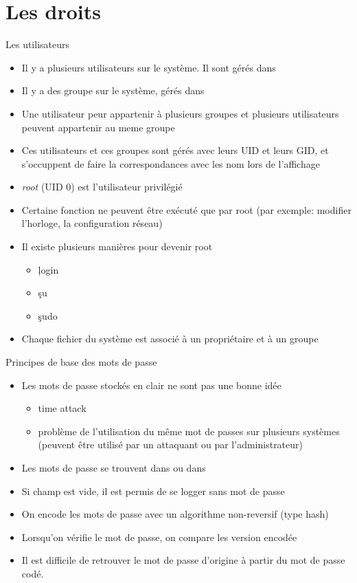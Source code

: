 \section{Les droits}

\begin{frame}[fragile=singleslide]{Les utilisateurs}
  \begin{itemize}
  \item Il  y a plusieurs utilisateurs  sur le système.  Il sont gérés
    dans 
  \item Il y a des groupe sur le système, gérés dans 
  \item  Une  utilisateur  peur  appartenir  à  plusieurs  groupes  et
    plusieurs utilisateurs peuvent appartenir au meme groupe
  \item Ces utilisateurs  et ces groupes sont gérés avec  leurs UID et leurs
    GID,  et   s'occuppent de faire
    la correspondances avec les nom lors de l'affichage
  \item \emph{root} (UID 0) est l'utilisateur privilégié
  \item Certaine  fonction ne peuvent  être exécuté que par  root (par
    exemple: modifier l'horloge, la configuration réseau)
  \item Il existe plusieurs manières pour devenir \c{root}
    \begin{itemize}
    \item \c{login}
    \item \c{su}
    \item \c{sudo}
    \end{itemize}
  \item Chaque fichier  du système est associé à  un propriétaire et à
    un groupe
  \end{itemize}
\end{frame}

\begin{frame}[fragile=singleslide]{Principes de base des mots de passe}
\begin{itemize} 
\item Les mots de passe stockés en clair ne sont pas une bonne idée
  \begin{itemize}
  \item time attack 
  \item problème de l'utilisation du  même mot de passes sur plusieurs
    systèmes   (peuvent être   utilisé   par  un   attaquant  ou   par
    l'administrateur)
  \end{itemize} 
\item Les  mots de passe  se trouvent dans   ou dans
\item Si champ est vide, il est permis de se logger sans mot de passe
\item  On encode  les mots  de passe  avec un  algorithme non-reversif
  (type hash)
\item  Lorsqu'on vérifie  le  mot  de passe,  on  compare les  version
  encodée
\item Il est difficile de retrouver le mot de passe d'origine à partir
  du mot de passe codé.
\end{itemize}
\end{frame}


